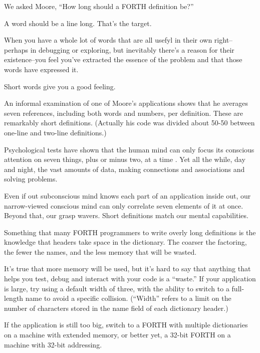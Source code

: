 \bigskip
\blackline{2ex}
\noindent We asked Moore,
``How long should a FORTH definition be?''

\begin{tfquot}
A word should be a line long. That's the target.

When you have a whole lot of words that are all usefyl in their own right--perhaps in debugging or exploring, but inevitably there's a reason for their existence--you feel you've extracted the essence of the problem and that those words have expressed it.

Short words give you a good feeling.
\end{tfquot}
\blackline{1ex}

An informal examination of one of Moore's applications shows that he averages seven references, including both words and numbers, per definition. These are remarkably short definitions. (Actually his code was divided about 50-50 between one-line and two-line definitions.)

Psychological tests have shown that the human mind can only focus its conscious attention on seven things, plus or minus two, at a time \cite{miller56}. Yet all the while, day and night, the vast amounts of data, making connections and associations and solving problems.

Even if out subconscious mind knows each part of an application inside out, our narrow-viewed conscious mind can only correlate seven elements of it at once. Beyond that, our grasp wavers. Short definitions match our mental capabilities.

Something that many FORTH programmers to write overly long definitions is the knowledge that headers take space in the dictionary. The coarser the factoring, the fewer the names, and the less memory that will be wasted.

It's true that more memory will be used, but it's hard to say that anything that helps you test, debug and interact with your code is a ``waste.'' If your application is large, try using a default width of three, with the ability to switch to a full-length name to avoid a specific collision. (``Width'' refers to a limit on the number of characters stored in the name field of each dictionary header.)

If the application is still too big, switch to a FORTH with multiple dictionaries on a machine with extended memory, or better yet, a 32-bit FORTH on a machine with 32-bit addressing.


